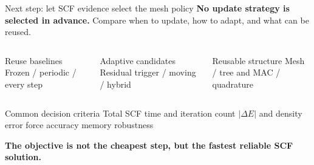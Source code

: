 \documentclass[aspectratio=169,11pt]{beamer}
\begin{document}
\begin{frame}[t]{Next step: let SCF evidence select the mesh policy}
  \centering\small
  \textbf{No update strategy is selected in advance.}
  Compare when to update, how to adapt, and what can be reused.

  \vspace{0.12cm}
  \begin{columns}[T,onlytextwidth]
      \begin{block}{Reuse baselines}
        \centering\footnotesize
        Frozen \; / \; periodic \; / \; every step
      \end{block}
      \begin{block}{Adaptive candidates}
        \centering\footnotesize
        Residual trigger \; / \; moving \; / \; hybrid
      \end{block}
      \begin{block}{Reusable structure}
        \centering\footnotesize
        Mesh \; / \; tree and MAC \; / \; quadrature
      \end{block}
  \end{columns}

  \vspace{0.10cm}
  \centering

  \vspace{0.10cm}
  \begin{block}{Common decision criteria}
    \centering\scriptsize
    Total SCF time and iteration count \quad $\vert\Delta E\vert$ and density error
    \quad force accuracy \quad memory \quad robustness
  \end{block}

  \vspace{-0.02cm}
  \centering\footnotesize\bfseries\color{navy}
  The objective is not the cheapest step, but the fastest reliable SCF solution.
\end{frame}
\end{document}
